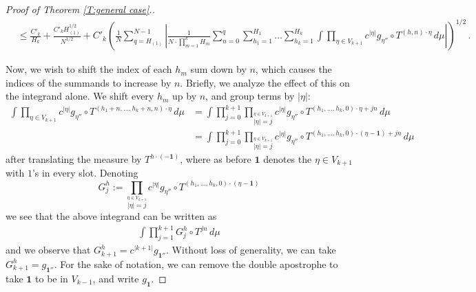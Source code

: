 \documentclass[11pt, oneside]{amsart}   	%
\newcommand{\1}{\mathbbm{1}}
\theoremstyle{definition}
\begin{document}
\begin{proof}[Proof of Theorem \ref{T:general case}.]
\begin{align*}
&\leq  \frac{C'_k}{H_k} + \frac{C'_k H_{(1)}^{1/2}}{N^{1/2}} + C'_k \left(\frac{1}{N} \sum_{q=H_{(1)}}^{N-1}  \left|\frac{1}{N \cdot \prod_{m=1}^{k} H_m} \sum_{n=0}^{q} \sum_{h_1 = 1}^{H_1} \dots \sum_{h_{k}=1}^{H_{k}}  \int \prod_{\eta\in V_{k+1}} c^{|\eta|} g_{\eta''} \circ T^{(h, n) \cdot \eta} \, d\mu \right|  \right)^{1/2} \, .
\end{align*}

Now, we wish to shift the index of each $h_m$ sum down by $n$, which causes the indices of the summands to increase by $n$. Briefly, we analyze the effect of this on the integrand alone. We shift every $h_m$ up by $n$, and group terms by $|\eta|$:
\begin{align*}
\int \prod_{\eta \in V_{k+1}} c^{|\eta|} g_{\eta''} \circ T^{(h_1 + n, \dots, h_k + n, n) \cdot \eta} \, d\mu &= \int \prod_{j=0}^{k+1} \prod_{\overset{\eta \in V_{k+1}}{|\eta| = j}} c^{|\eta|} g_{\eta''} \circ T^{(h_1, \dots, h_k, 0) \cdot \eta + jn} \, d\mu \\
&=\int \prod_{j=0}^{k+1} \prod_{\overset{\eta \in V_{k+1}}{|\eta| = j}} c^{|\eta|} g_{\eta''} \circ T^{(h_1, \dots, h_k, 0) \cdot (\eta - \textbf{1}) + jn} \, d\mu
\end{align*}
after translating the measure by $T^{h \cdot (-\textbf{1})}$, where as before $\textbf{1}$ denotes the $\eta\in V_{k+1}$ with $1$'s in every slot. Denoting
$$G^h_j := \prod_{\overset{\eta \in V_{k+1}}{|\eta| = j}} c^{|\eta|} g_{\eta''} \circ T^{(h_1, \dots, h_k, 0) \cdot (\eta- \textbf{1}) }$$
we see that the above integrand can be written as
\begin{align*}
\int \prod_{j=1}^{k+1} G^h_j \circ T^{jn} \, d\mu
\end{align*}
and we observe that $G^h_{k+1} = c^{|k+1|}g_{\textbf{1}''}$. Without loss of generality, we can take $G^h_{k+1} = g_{\textbf{1}''}$. For the sake of notation, we can remove the double apostrophe to take $\mathbf{1}$ to be in $V_{k-1}$, and write $g_{\mathbf{1}}$.


\end{proof}
\end{document}
